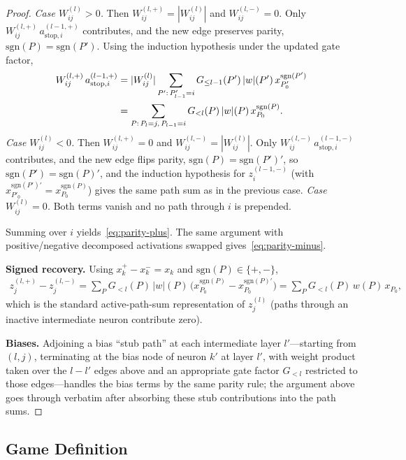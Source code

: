 \documentclass[twoside]{article}
\newif\ifch \chfalse
\newcommand{\ch}[1]{\ifch\textcolor{magenta}{#1}\else#1\fi}
\newcommand{\1}{\mathbf{1}}
\begin{document}
\begin{proof}
\emph{Case $W^{(l)}_{ij} > 0$.} Then $W_{ij}^{(l,+)} = |W^{(l)}_{ij}|$ and $W_{ij}^{(l,-)} = 0$.
Only $W_{ij}^{(l,+)}\, a_{\mathrm{stop},i}^{(l-1,+)}$ contributes, and the new edge preserves
parity, $\mathrm{sgn}(P) = \mathrm{sgn}(P')$. Using the induction hypothesis under the updated gate
factor,
\begin{align}
    W_{ij}^{(l,+)}\, a_{\mathrm{stop},i}^{(l-1,+)}
    &= |W^{(l)}_{ij}| \sum_{P':\, P'_{l-1} = i} G_{\le l-1}(P')\, |w|(P')\, x_{P'_0}^{\mathrm{sgn}(P')}
    \notag\\
    &= \sum_{P:\, P_l = j,\, P_{l-1} = i} G_{<l}(P)\, |w|(P)\, x_{P_0}^{\mathrm{sgn}(P)}.
\end{align}
\emph{Case $W^{(l)}_{ij} < 0$.} Then $W_{ij}^{(l,+)} = 0$ and $W_{ij}^{(l,-)} = |W^{(l)}_{ij}|$.
Only $W_{ij}^{(l,-)}\, a_{\mathrm{stop},i}^{(l-1,-)}$ contributes, and the new edge flips parity,
$\mathrm{sgn}(P) = \mathrm{sgn}(P')'$, so $\mathrm{sgn}(P') = \mathrm{sgn}(P)'$, and the induction
hypothesis for $z_i^{(l-1,-)}$ (with $x_{P'_0}^{\mathrm{sgn}(P')'} = x_{P_0}^{\mathrm{sgn}(P)}$)
gives the same path sum as in the previous case.
\emph{Case $W^{(l)}_{ij} = 0$.} Both terms vanish and no path through $i$ is prepended.

Summing over $i$ yields~\eqref{eq:parity-plus}. The same argument with positive/negative decomposed
activations swapped gives~\eqref{eq:parity-minus}.

\textbf{Signed recovery.} Using $x_k^+ - x_k^- = x_k$ and $\mathrm{sgn}(P) \in \{+,-\}$,
\begin{align}
    z_j^{(l,+)} - z_j^{(l,-)}
    = \sum_P G_{<l}(P)\, |w|(P)\, \bigl(x_{P_0}^{\mathrm{sgn}(P)} - x_{P_0}^{\mathrm{sgn}(P)'}\bigr)
    = \sum_P G_{<l}(P)\, w(P)\, x_{P_0},
\end{align}
which is the standard active-path-sum representation of $z_j^{(l)}$ (paths through an inactive
intermediate neuron contribute zero).

\textbf{Biases.} Adjoining a bias ``stub path'' at each intermediate layer $l'$---starting from
$(l,j)$, terminating at the bias node of neuron $k'$ at layer $l'$, with weight product taken over \ch{the
$l - l'$ edges above and an appropriate gate factor $G_{<l}$ restricted to those edges}---handles the
bias terms by the same parity rule; the argument above goes through verbatim
after absorbing these stub contributions into the path sums.
\end{proof}

\subsection{Game Definition}\label{app:adf-game-def}\label{app:adf-recursion}
\end{document}
